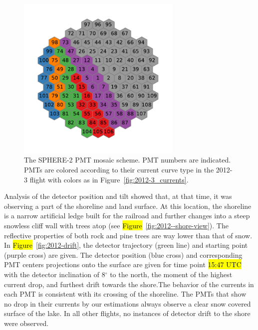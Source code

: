 \documentclass[universe,article,accept,moreauthors,pdftex]{Definitions/mdpi}
\begin{document}
\begin{figure}[H]
        \includegraphics[width=0.7\textwidth]{2012-3_retina_all.pdf}
        \caption{The SPHERE-2 PMT mosaic scheme. PMT numbers are indicated. PMTs are colored according to their current curve type in the 2012-3 flight with colors as in Figure~\ref{fig:2012-3_currents}.}
        \label{fig:2012-3_shore_image}
\end{figure}


Analysis of the detector position and tilt showed that, at that time, it was observing a part of the shoreline and land surface. At this location, the shoreline is a narrow artificial ledge built for the railroad and further changes into a steep snowless cliff wall with trees atop (see \hl{Figure}~\ref{fig:2012--shore-view}). The reflective properties of both rock and pine trees are way lower than that of snow. In \hl{Figure}~\ref{fig:2012-drift}, the detector trajectory (green line) and starting point (purple cross) are given. The detector position (blue cross) and corresponding PMT centers projections onto the surface are given for time point \hl{15:47 UTC} 
with the detector inclination of 8$^\circ$ to the north, the moment of the highest current drop, and furthest drift towards the shore.The behavior of the currents in each PMT is consistent with its crossing of the shoreline. The PMTs that show no drop in their currents by our estimations always observe a clear snow covered surface of the lake. In all other flights, no instances of detector drift to the shore were observed.%
\end{document}
